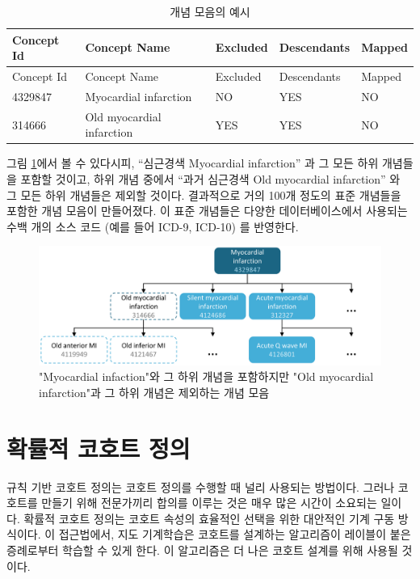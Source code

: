\documentclass[11pt]{book}
\theoremstyle{definition}
\theoremstyle{definition}
\theoremstyle{definition}
\theoremstyle{remark}
\begin{document}
\begin{longtable}[]{@{}lllll@{}}
\caption{\label{tab:conceptSetExpression} 개념 모음의 예시}\tabularnewline
\toprule
Concept Id & Concept Name & Excluded & Descendants &
Mapped\tabularnewline
\midrule
\endfirsthead
\toprule
Concept Id & Concept Name & Excluded & Descendants &
Mapped\tabularnewline
\midrule
\endhead
4329847 & Myocardial infarction & NO & YES & NO\tabularnewline
314666 & Old myocardial infarction & YES & YES & NO\tabularnewline
\bottomrule
\end{longtable}

그림 \ref{fig:conceptSet}에서 볼 수 있다시피, ``심근경색 Myocardial
infarction'' 과 그 모든 하위 개념들을 포함할 것이고, 하위 개념 중에서
``과거 심근경색 Old myocardial infarction'' 와 그 모든 하위 개념들은
제외할 것이다. 결과적으로 거의 100개 정도의 표준 개념들을 포함한 개념
모음이 만들어졌다. 이 표준 개념들은 다양한 데이터베이스에서 사용되는
수백 개의 소스 코드 (예를 들어 ICD-9, ICD-10) 를 반영한다.

\begin{figure}

{\centering \includegraphics[width=1\linewidth]{images/Cohorts/conceptSet} 

}

\caption{"Myocardial infaction"와 그 하위 개념을 포함하지만 "Old myocardial infarction"과 그 하위 개념은 제외하는 개념 모음}\label{fig:conceptSet}
\end{figure}

\section{확률적 코호트 정의}\label{--}

규칙 기반 코호트 정의는 코호트 정의를 수행할 때 널리 사용되는 방법이다.
그러나 코호트를 만들기 위해 전문가끼리 합의를 이루는 것은 매우 많은
시간이 소요되는 일이다. 확률적 코호트 정의는 코호트 속성의 효율적인
선택을 위한 대안적인 기계 구동 방식이다. 이 접근법에서, 지도 기계학습은
코호트를 설계하는 알고리즘이 레이블이 붙은 증례로부터 학습할 수 있게
한다. 이 알고리즘은 더 나은 코호트 설계를 위해 사용될 것이다.
\end{document}
